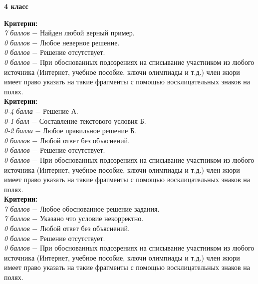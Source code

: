 \centerline{\bf \Huge 4 класс}

 \textbf{Критерии:} \\
\textit{7 баллов} $-$ Найден любой верный пример.\\
\textit{0 баллов} $-$ Любое неверное решение.\\
\textit{0 баллов} $-$ Решение отсутствует.\\
\textit{0 баллов} $-$ При обоснованных подозрениях на списывание участником из любого источника (Интернет, учебное пособие, ключи олимпиады и т.д.) член жюри имеет право указать на такие фрагменты с помощью восклицательных знаков на полях. \\

 \textbf{Критерии:} \\
\textit{0-4 балла} $-$ Решение А.\\
\textit{0-1 балл} $-$ Составление текстового условия Б.\\
\textit{0-2 балла} $-$ Любое правильное решение Б.\\
\textit{0 баллов} $-$ Любой ответ без объяснений.\\
\textit{0 баллов} $-$ Решение отсутствует.\\
\textit{0 баллов} $-$ При обоснованных подозрениях на списывание участником из любого источника (Интернет, учебное пособие, ключи олимпиады и т.д.) член жюри имеет право указать на такие фрагменты с помощью восклицательных знаков на полях. \\


 \textbf{Критерии:} \\
\textit{7 баллов} $-$ Любое обоснованное решение задания.\\
\textit{7 баллов} $-$ Указано что условие некорректно.\\
\textit{0 баллов} $-$ Любой ответ без объяснений.\\
\textit{0 баллов} $-$ Решение отсутствует.\\
\textit{0 баллов} $-$ При обоснованных подозрениях на списывание участником из любого источника (Интернет, учебное пособие, ключи олимпиады и т.д.) член жюри имеет право указать на такие фрагменты с помощью восклицательных знаков на полях. \\



